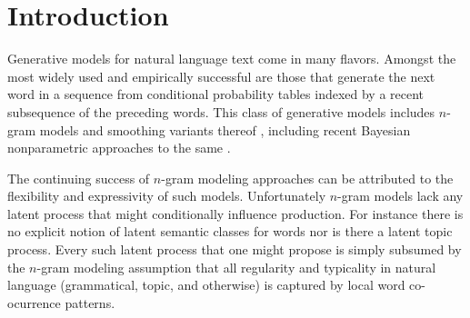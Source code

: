 \section{Introduction}


Generative models for natural language text come in many flavors.  Amongst the most widely used and empirically successful are those that  generate the next word in a sequence from conditional probability tables indexed by a recent subsequence of the preceding words.  This class of generative models includes $n$-gram models  and smoothing variants thereof \cite{Kneser1995,MacKay1995,Chen1998}, including recent Bayesian nonparametric approaches to the same \cite{Teh2006a,Wood2009}.  

The continuing success of $n$-gram modeling approaches can be attributed to the flexibility and expressivity of such models. %
Unfortunately $n$-gram models lack any latent process that might conditionally influence production.  For instance there is no explicit notion of latent semantic classes for words nor is there a latent topic process.  Every such latent process that one might propose is simply subsumed by the $n$-gram modeling assumption that all regularity and typicality in natural language (grammatical, topic, and otherwise) is captured by local word co-ocurrence patterns.  


